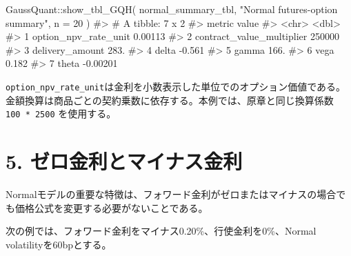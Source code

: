 \documentclass[
  letterpaper,
  DIV=11,
  numbers=noendperiod]{scrreprt}
\newenvironment{Shaded}{\begin{snugshade}}{\end{snugshade}}
\newcommand{\AttributeTok}[1]{\textcolor[rgb]{0.40,0.45,0.13}{#1}}
\newcommand{\CommentTok}[1]{\textcolor[rgb]{0.37,0.37,0.37}{#1}}
\newcommand{\DecValTok}[1]{\textcolor[rgb]{0.68,0.00,0.00}{#1}}
\newcommand{\FunctionTok}[1]{\textcolor[rgb]{0.28,0.35,0.67}{#1}}
\newcommand{\NormalTok}[1]{\textcolor[rgb]{0.00,0.23,0.31}{#1}}
\newcommand{\SpecialCharTok}[1]{\textcolor[rgb]{0.37,0.37,0.37}{#1}}
\newcommand{\StringTok}[1]{\textcolor[rgb]{0.13,0.47,0.30}{#1}}
\begin{document}
\begin{Shaded}
\begin{Highlighting}[]
\NormalTok{GaussQuant}\SpecialCharTok{::}\FunctionTok{show\_tbl\_GQH}\NormalTok{(}
\NormalTok{  normal\_summary\_tbl,}
  \StringTok{"Normal futures{-}option summary"}\NormalTok{,}
  \AttributeTok{n =} \DecValTok{20}
\NormalTok{)}
\CommentTok{\#\textgreater{} \# A tibble: 7 x 2}
\CommentTok{\#\textgreater{}   metric                           value}
\CommentTok{\#\textgreater{}   \textless{}chr\textgreater{}                            \textless{}dbl\textgreater{}}
\CommentTok{\#\textgreater{} 1 option\_npv\_rate\_unit           0.00113}
\CommentTok{\#\textgreater{} 2 contract\_value\_multiplier 250000      }
\CommentTok{\#\textgreater{} 3 delivery\_amount              283.     }
\CommentTok{\#\textgreater{} 4 delta                         {-}0.561  }
\CommentTok{\#\textgreater{} 5 gamma                        166.     }
\CommentTok{\#\textgreater{} 6 vega                           0.182  }
\CommentTok{\#\textgreater{} 7 theta                         {-}0.00201}
\end{Highlighting}
\end{Shaded}

\texttt{option\_npv\_rate\_unit}は金利を小数表示した単位でのオプション価値である。金額換算は商品ごとの契約乗数に依存する。本例では、原章と同じ換算係数
\texttt{100\ *\ 2500} を使用する。

\section{5.
ゼロ金利とマイナス金利}\label{ux30bcux30edux91d1ux5229ux3068ux30deux30a4ux30caux30b9ux91d1ux5229}

Normalモデルの重要な特徴は、フォワード金利がゼロまたはマイナスの場合でも価格公式を変更する必要がないことである。

次の例では、フォワード金利をマイナス0.20\%、行使金利を0\%、Normal
volatilityを60bpとする。
\end{document}
